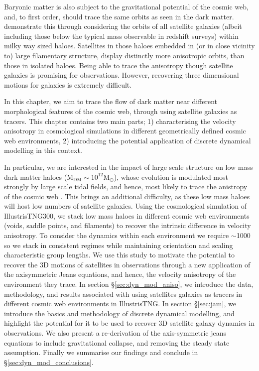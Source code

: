 Baryonic matter is also subject to the gravitational potential of the cosmic web, and, to first order, should trace the same orbits as seen in the dark matter. \citep[][]{garaldi2018} demonstrate this through considering the orbits of all satellite galaxies (albeit including those below the typical mass observable in redshift surveys) within milky way sized haloes. Satellites in those haloes embedded in (or in close vicinity to) large filamentary structure, display distinctly more anisotropic orbits, than those in isolated haloes. Being able to trace the anisotropy though satellite galaxies is promising for observations. However, recovering three dimensional motions for galaxies is extremely difficult.

In this chapter, we aim to trace the flow of dark matter near different morphological features of the cosmic web, through using satellite galaxies as tracers. This chapter contains two main parts; 1) characterising the velocity anisotropy in cosmological simulations in different geometrically defined cosmic web environments, 2) introducing the potential application of discrete dynamical modelling in this context.

In particular, we are interested in the impact of large scale structure on low mass dark matter haloes ($\mathrm{M_{DM} \sim 10^{12}M_{\odot}}$), whose evolution is modulated most strongly by large scale tidal fields, and hence, most likely to trace the anistropy of the cosmic web \citep[e.g.][]{tojeiro2017}. This brings an additional difficulty, as these low mass haloes will host low numbers of satellite galaxies. Using the cosmological simulation of IllustrisTNG300, we stack low mass haloes in different cosmic web environments (voids, saddle points, and filaments) to recover the intrinsic difference in velocity anisotropy. To consider the dynamics within each environment we require $\sim$1000 so we stack in consistent regimes while maintaining orientation and scaling characteristic group lengths. We use this study to motivate the potential to recover the 3D motions of satellites in observations through a new application of the axisymmetric Jeans equations, and hence, the velocity anisotropy of the environment they trace. In section \S\ref{sec:dyn_mod_aniso}, we introduce the data, methodology, and results associated with using satellites galaxies as tracers in different cosmic web environments in IllustrisTNG. In section \S\ref{sec:jam}, we introduce the basics and methodology of discrete dynamical modelling, and highlight the potential for it to be used to recover 3D satellite galaxy dynamics in observations. We also present a re-derivation of the axis-symmetric jeans equations to include gravitational collapse, and removing the steady state assumption. Finally we summarise our findings and conclude in \S\ref{sec:dyn_mod_conclusions}.

